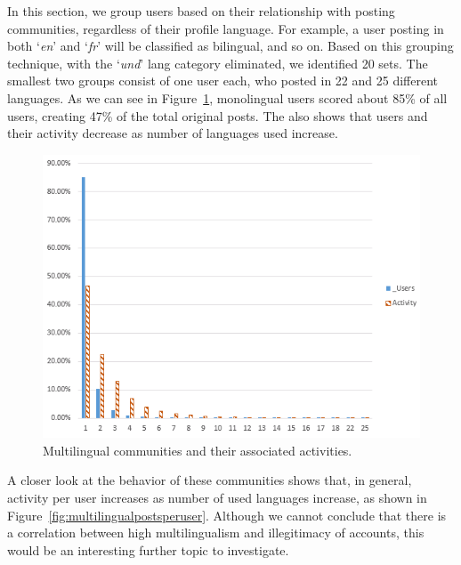 In this section, we group users based on their relationship with
posting communities, regardless of their profile language. For
example, a user posting in both `{\emph{en}}' and `{\emph{fr}}' will
be classified as bilingual, and so on. Based on this grouping
technique, with the `{\emph{und}}' lang category eliminated, we
identified 20 sets. The smallest two groups consist of one user each,
who posted in 22 and 25 different languages.  As we can see in
Figure~\ref{fig:multilingual}, monolingual users scored about 85\% of
all users, creating 47\% of the total original posts. The also shows
that users and their activity decrease as number of languages used
increase.


\begin{figure}[htb]
\centering
\includegraphics[width=\columnwidth]{images/multilingualcommunities.png}
\caption{Multilingual communities and their associated activities.}
\label{fig:multilingual}
\end{figure}


A closer look at the behavior of these communities shows that, in
general, activity per user increases as number of used languages
increase, as shown in
Figure~\ref{fig:multilingualpostsperuser}. Although we cannot conclude
that there is a correlation between high multilingualism and
illegitimacy of accounts, this would be an interesting further topic
to investigate.


